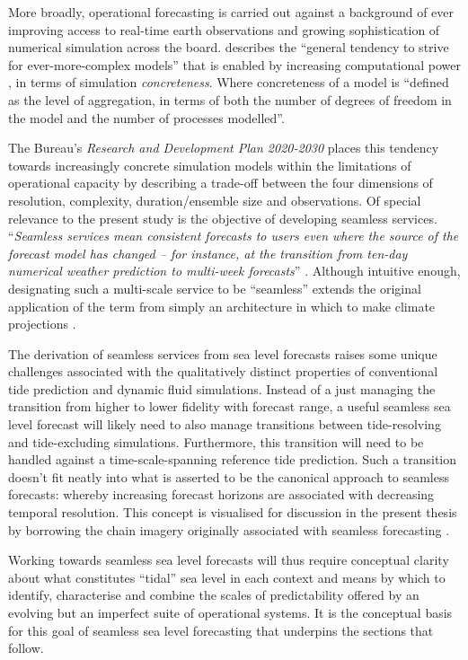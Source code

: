 More broadly, operational forecasting is carried out against a background of ever improving access to real-time earth observations and growing sophistication of numerical simulation across the board.
\citet{Petersen:2012tr} describes the ``general tendency to strive for ever-more-complex models'' that is enabled by increasing computational power , in terms of simulation \emph{concreteness}. Where concreteness of a model is ``defined as the level of aggregation, in terms of both the number of degrees of freedom in the model and the number of processes modelled''.

The Bureau's \textit{Research and Development Plan 2020-2030} places this tendency towards increasingly concrete simulation models within the limitations of operational capacity by describing a trade-off between the four dimensions of resolution, complexity, duration/ensemble size and observations. 
Of special relevance to the present study is the objective of developing seamless services.  ``\textit{Seamless services mean consistent forecasts to users even where the source of the forecast model has changed – for instance, at the transition from ten-day numerical weather prediction to multi-week forecasts}'' \citep{BOM2020}.
Although intuitive enough, designating such a multi-scale service to be ``seamless'' extends the original application of the term from simply an architecture in which to make climate projections \citep{10.1175/bams-87-9-1195}.   


The derivation of seamless services from sea level forecasts raises some unique challenges associated with the qualitatively distinct properties of conventional tide prediction and dynamic fluid simulations.   
Instead of a just managing the transition from higher to lower fidelity with forecast range, a useful seamless sea level forecast will likely need to also manage transitions between tide-resolving and tide-excluding simulations. Furthermore, this transition will need to be handled against a time-scale-spanning reference tide prediction.  Such a transition doesn't fit neatly into what is asserted to be the canonical approach to seamless forecasts: whereby increasing forecast horizons are associated with decreasing temporal resolution.   This concept is visualised for discussion in the present thesis by borrowing the chain imagery originally associated with seamless forecasting \citep{10.1175/bams-87-9-1195}.



Working towards seamless sea level forecasts will thus require conceptual clarity about what constitutes ``tidal'' sea level in each context and means by which to identify, characterise and combine the scales of predictability offered by an evolving but an imperfect suite of operational systems.  
It is the conceptual basis for this goal of seamless sea level forecasting that underpins the sections that follow.
